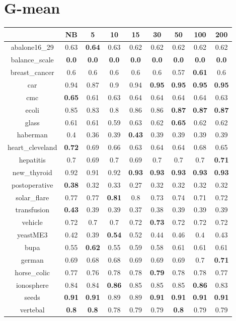 \documentclass{article}%
\begin{document}
%
\section*{G{-}mean}%
\begin{tabular}{c|cccccccc}%
\hline%
&NB&5&10&15&30&50&100&200\\%
\hline%
abalone16\_29&0.63&\textbf{0.64}&0.63&0.62&0.62&0.62&0.62&0.62\\%
\hline%
balance\_scale&\textbf{0.0}&\textbf{0.0}&\textbf{0.0}&\textbf{0.0}&\textbf{0.0}&\textbf{0.0}&\textbf{0.0}&\textbf{0.0}\\%
\hline%
breast\_cancer&0.6&0.6&0.6&0.6&0.6&0.57&\textbf{0.61}&0.6\\%
\hline%
car&0.94&0.87&0.9&0.94&\textbf{0.95}&\textbf{0.95}&\textbf{0.95}&\textbf{0.95}\\%
\hline%
cmc&\textbf{0.65}&0.61&0.63&0.64&0.64&0.64&0.64&0.63\\%
\hline%
ecoli&0.85&0.83&0.8&0.86&0.86&\textbf{0.87}&\textbf{0.87}&\textbf{0.87}\\%
\hline%
glass&0.61&0.61&0.59&0.63&0.62&\textbf{0.65}&0.62&0.62\\%
\hline%
haberman&0.4&0.36&0.39&\textbf{0.43}&0.39&0.39&0.39&0.39\\%
\hline%
heart\_cleveland&\textbf{0.72}&0.69&0.66&0.63&0.64&0.64&0.68&0.65\\%
\hline%
hepatitis&0.7&0.69&0.7&0.69&0.7&0.7&0.7&\textbf{0.71}\\%
\hline%
new\_thyroid&0.92&0.91&0.92&\textbf{0.93}&\textbf{0.93}&\textbf{0.93}&\textbf{0.93}&\textbf{0.93}\\%
\hline%
postoperative&\textbf{0.38}&0.32&0.33&0.27&0.32&0.32&0.32&0.32\\%
\hline%
solar\_flare&0.77&0.77&\textbf{0.81}&0.8&0.73&0.74&0.71&0.72\\%
\hline%
transfusion&\textbf{0.43}&0.39&0.39&0.37&0.38&0.39&0.39&0.39\\%
\hline%
vehicle&0.72&0.7&0.7&0.72&\textbf{0.73}&0.72&0.72&0.72\\%
\hline%
yeastME3&0.42&0.39&\textbf{0.54}&0.52&0.44&0.46&0.4&0.43\\%
\hline%
bupa&0.55&\textbf{0.62}&0.55&0.59&0.58&0.61&0.61&0.61\\%
\hline%
german&0.69&0.68&0.68&0.69&0.69&0.69&0.7&\textbf{0.71}\\%
\hline%
horse\_colic&0.77&0.76&0.78&0.78&\textbf{0.79}&0.78&0.78&0.77\\%
\hline%
ionosphere&0.84&0.84&\textbf{0.86}&0.85&0.85&0.85&\textbf{0.86}&0.83\\%
\hline%
seeds&\textbf{0.91}&\textbf{0.91}&0.89&0.89&\textbf{0.91}&\textbf{0.91}&\textbf{0.91}&\textbf{0.91}\\%
\hline%
vertebal&\textbf{0.8}&\textbf{0.8}&0.78&0.79&0.79&\textbf{0.8}&0.79&0.79\\%
\hline%
\end{tabular}

%
\end{document}
